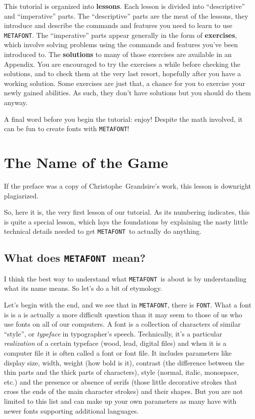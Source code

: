 \documentclass[a4paper,11pt,twoside]{book}
\newcommand{\MF}{{\tt METAFONT}}
\begin{document}
This tutorial is organized into \textbf{lessons}.
Each lesson is divided into ``descriptive'' and ``imperative'' parts.
The ``descriptive'' parts are the meat of the lessons, they introduce and describe the commands
and features you need to learn to use \MF.
The ``imperative'' parts appear generally in the form of \textbf{exercises}, which involve solving
problems using the commands and features you've been introduced to.
The \textbf{solutions} to many of those exercises are available in an Appendix.
You are encouraged to try the exercises a while before checking the solutions, and to check them
at the very last resort, hopefully after you have a working solution.
Some exercises are just that, a chance for you to exercise your newly gained abilities.
As such, they don't have solutions but you should do them anyway.

A final word before you begin the tutorial: enjoy!
Despite the math involved, it can be fun to create fonts with \MF!

\tableofcontents

\mainmatter

\setcounter{chapter}{-1}
\chapter{The Name of the Game}

\begin{framed}
If the preface was a copy of Christophe~Grandsire's work, this lesson is downright plagiarized.
\end{framed}

So, here it is, the very first lesson of our tutorial.
As its numbering indicates, this is quite a special lesson, which lays the foundations by
explaining the nasty little technical details needed to get \MF\ to actually do anything.

\section{What does \MF\ mean?}

I think the best way to understand what \MF\ is about is by understanding what its name means.
So let's do a bit of etymology.

Let's begin with the end, and we see that in \MF, there is \texttt{FONT}.
What a font is is a is actually a more difficult question than it may seem to those of us who use
fonts on all of our computers.
A font is a collection of characters of similar ``style'', or \emph{typeface} in typographer's
speech.
Technically, it's a particular \emph{realization} of a certain typeface (wood, lead, digital
files) and when it is a computer file it is often called a font or font file.
It includes parameters like display size, width, weight (how bold is it), contrast (the
difference between the thin parts and the thick parts of characters), style (normal, italic,
monospace, etc.) and the presence or absence of serifs (those little decorative strokes that
cross the ends of the main character strokes) and their shapes.
But you are not limited to this list and can make up your own parameters as many have with newer
fonts supporting additional languages.
\end{document}
